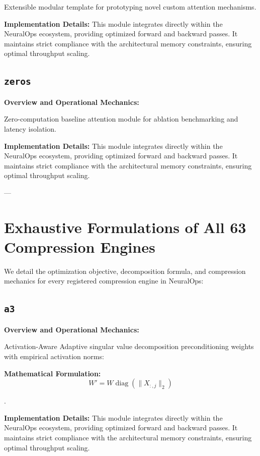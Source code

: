 \documentclass[10pt,twocolumn,letterpaper]{article}
\begin{document}
Extensible modular template for prototyping novel custom attention mechanisms.

\textbf{Implementation Details:}
This module integrates directly within the NeuralOps ecosystem, providing optimized forward and backward passes. It maintains strict compliance with the architectural memory constraints, ensuring optimal throughput scaling.

\subsection{\texttt{zeros}}
\textbf{Overview and Operational Mechanics:}

Zero-computation baseline attention module for ablation benchmarking and latency isolation.

\textbf{Implementation Details:}
This module integrates directly within the NeuralOps ecosystem, providing optimized forward and backward passes. It maintains strict compliance with the architectural memory constraints, ensuring optimal throughput scaling.


---

\section{Exhaustive Formulations of All 63 Compression Engines}
\label{app:full_compressor_details}

We detail the optimization objective, decomposition formula, and compression mechanics for every registered compression engine in NeuralOps:

\subsection{\texttt{a3}}
\textbf{Overview and Operational Mechanics:}

Activation-Aware Adaptive singular value decomposition preconditioning weights with empirical activation norms:

\textbf{Mathematical Formulation:}
\begin{equation}
W' = W \operatorname{diag}(\|X_{:, j}\|_2)
\end{equation}

.

\textbf{Implementation Details:}
This module integrates directly within the NeuralOps ecosystem, providing optimized forward and backward passes. It maintains strict compliance with the architectural memory constraints, ensuring optimal throughput scaling.
\end{document}
